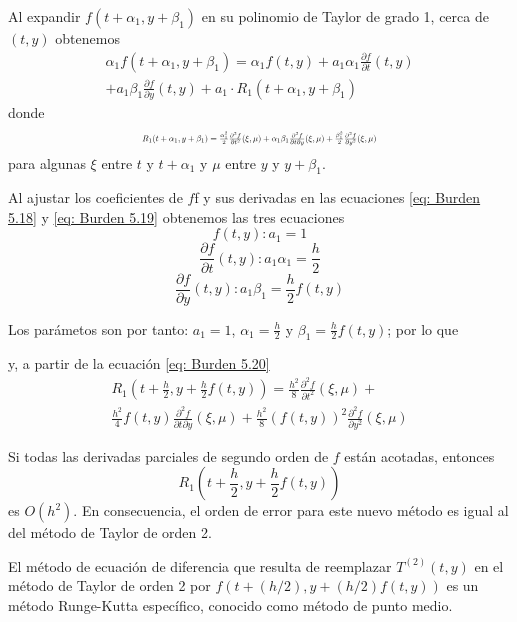 Al expandir $f(t + \alpha_1, y + \beta_1)$ en su polinomio de Taylor de grado 1, cerca de $(t, y)$ obtenemos
\begin{multline}
    \label{eq: Burden 5.19}
    \alpha_1 f(t + \alpha_1, y + \beta_1) = \alpha_1 f(t, y) + a_1 \alpha_1 \frac{\partial f}{\partial t} (t, y) \\
    + a_1 \beta_1 \frac{\partial f}{\partial y} (t, y) + a_1 \cdot R_1 (t + \alpha_1, y + \beta_1)
\end{multline}
donde 
\begin{equation}
    \label{eq: Burden 5.20}
    \resizebox{0.5\textwidth}{!}{
        $ R_1(t + \alpha_1, y + \beta_1) = \frac{\alpha_1^2}{2} \frac{\partial^2 f}{\partial t^2} (\xi, \mu) + \alpha_1 \beta_1 \frac{\partial^2 f}{\partial t \partial y} (\xi, \mu) + \frac{\beta_1^2}{2} \frac{\partial^2 f}{\partial y^2} (\xi, \mu) $
    }
\end{equation}
para algunas $\xi$ entre $t$ y $t + \alpha_1$ y $\mu$ entre $y$ y $y + \beta_1$.

Al ajustar los coeficientes de $f$f y sus derivadas en las ecuaciones \ref{eq: Burden 5.18} y \ref{eq: Burden 5.19} obtenemos las tres ecuaciones
\[f(t, y): a_1 = 1\]
\[\frac{\partial f}{\partial t} (t, y): a_1 \alpha_1 = \frac{h}{2}\]
\[\frac{\partial f}{\partial y}(t, y): a_1 \beta_1 = \frac{h}{2}f(t, y)\]

Los parámetos son por tanto: $a_1 = 1$, $\alpha_1 = \frac{h}{2}$ y $\beta_1 = \frac{h}{2}f(t, y)$; por lo que 

y, a partir de la ecuación \ref{eq: Burden 5.20}
\begin{multline*}
    R_1 \left( t + \frac{h}{2}, y + \frac{h}{2}f(t, y) \right) = \frac{h^2}{8} \frac{\partial^2 f}{\partial t^2} (\xi, \mu) + \\
    \frac{h^2}{4} f(t, y) \frac{\partial^2 f}{\partial t \partial y} (\xi, \mu) + \frac{h^2}{8}(f(t, y))^2 \frac{\partial^2 f}{\partial y^2} (\xi, \mu)
\end{multline*}

Si todas las derivadas parciales de segundo orden de $f$ están acotadas, entonces
\[ R_1 \left( t + \frac{h}{2}, y + \frac{h}{2} f(t, y) \right) \]
es $O(h^2)$. En consecuencia, el orden de error para este nuevo método es igual al del método de Taylor de orden 2.

El método de ecuación de diferencia que resulta de reemplazar $T^{(2)}(t, y)$ en el método de Taylor de orden 2 por $f(t + (h/2), y + (h/2)f(t,y))$ es un método Runge-Kutta específico, conocido como método de punto medio.

